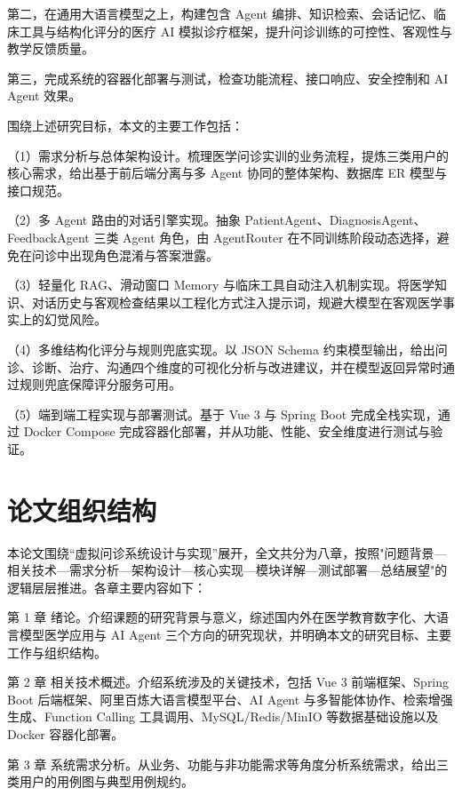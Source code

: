 第二，在通用大语言模型之上，构建包含 Agent 编排、知识检索、会话记忆、临床工具与结构化评分的医疗 AI 模拟诊疗框架，提升问诊训练的可控性、客观性与教学反馈质量。

第三，完成系统的容器化部署与测试，检查功能流程、接口响应、安全控制和 AI Agent 效果。

围绕上述研究目标，本文的主要工作包括：

（1）需求分析与总体架构设计。梳理医学问诊实训的业务流程，提炼三类用户的核心需求，给出基于前后端分离与多 Agent 协同的整体架构、数据库 ER 模型与接口规范。

（2）多 Agent 路由的对话引擎实现。抽象 PatientAgent、DiagnosisAgent、FeedbackAgent 三类 Agent 角色，由 AgentRouter 在不同训练阶段动态选择，避免在问诊中出现角色混淆与答案泄露。

（3）轻量化 RAG、滑动窗口 Memory 与临床工具自动注入机制实现。将医学知识、对话历史与客观检查结果以工程化方式注入提示词，规避大模型在客观医学事实上的幻觉风险。

（4）多维结构化评分与规则兜底实现。以 JSON Schema 约束模型输出，给出问诊、诊断、治疗、沟通四个维度的可视化分析与改进建议，并在模型返回异常时通过规则兜底保障评分服务可用。

（5）端到端工程实现与部署测试。基于 Vue 3 与 Spring Boot 完成全栈实现，通过 Docker Compose 完成容器化部署，并从功能、性能、安全维度进行测试与验证。

\section{论文组织结构}

本论文围绕“虚拟问诊系统设计与实现”展开，全文共分为八章，按照"问题背景—相关技术—需求分析—架构设计—核心实现—模块详解—测试部署—总结展望"的逻辑层层推进。各章主要内容如下：

第 1 章 绪论。介绍课题的研究背景与意义，综述国内外在医学教育数字化、大语言模型医学应用与 AI Agent 三个方向的研究现状，并明确本文的研究目标、主要工作与组织结构。

第 2 章 相关技术概述。介绍系统涉及的关键技术，包括 Vue 3 前端框架、Spring Boot 后端框架、阿里百炼大语言模型平台、AI Agent 与多智能体协作、检索增强生成、Function Calling 工具调用、MySQL/Redis/MinIO 等数据基础设施以及 Docker 容器化部署。

第 3 章 系统需求分析。从业务、功能与非功能需求等角度分析系统需求，给出三类用户的用例图与典型用例规约。

